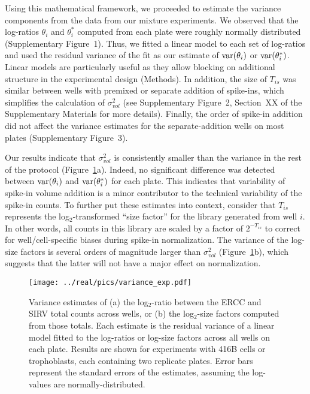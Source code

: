 \documentclass{article}
\newcommand{\suppfignorm}{1}
\newcommand{\suppfigtotals}{2}
\newcommand{\suppfigorder}{3}
\begin{document}
Using this mathematical framework, we proceeded to estimate the variance components from the data from our mixture experiments.
We observed that the log-ratios $\theta_i$ and $\theta^*_i$ computed from each plate were roughly normally distributed (Supplementary Figure~\suppfignorm{}).
Thus, we fitted a linear model to each set of log-ratios and used the residual variance of the fit as our estimate of $\mbox{var}(\theta_i)$ or $\mbox{var}(\theta^*_i)$.
Linear models are particularly useful as they allow blocking on additional structure in the experimental design (Methods).
In addition, the size of $T_{is}$ was similar between wells with premixed or separate addition of spike-ins, which simplifies the calculation of $\sigma^2_{vol}$ (see Supplementary Figure~\suppfigtotals{}, Section~XX of the Supplementary Materials for more details).
Finally, the order of spike-in addition did not affect the variance estimates for the separate-addition wells on most plates (Supplementary Figure~\suppfigorder{}).

Our results indicate that $\sigma^2_{vol}$ is consistently smaller than the variance in the rest of the protocol (Figure~\ref{fig:varestimates}a).
Indeed, no significant difference was detected between $\mbox{var}(\theta_i)$ and $\mbox{var}(\theta^*_i)$ for each plate.
This indicates that variability of spike-in volume addition is a minor contributor to the technical variability of the spike-in counts.
To further put these estimates into context, consider that $T_{is}$ represents the log$_2$-transformed ``size factor'' for the library generated from well $i$.
In other words, all counts in this library are scaled by a factor of $2^{-T_{is}}$ to correct for well/cell-specific biases during spike-in normalization.
The variance of the log-size factors is several orders of magnitude larger than $\sigma^2_{vol}$ (Figure~\ref{fig:varestimates}b), which suggests that the latter will not have a major effect on normalization.

\begin{figure}[btp]
    \begin{center}
        \texttt{[image: ../real/pics/variance\_exp.pdf]}
    \end{center}
    \caption{Variance estimates of (a) the log$_2$-ratio between the ERCC and SIRV total counts across wells, or (b) the log$_2$-size factors computed from those totals.
        Each estimate is the residual variance of a linear model fitted to the log-ratios or log-size factors across all wells on each plate.
        Results are shown for experiments with 416B cells or trophoblasts, each containing two replicate plates.
        Error bars represent the standard errors of the estimates, assuming the log-values are normally-distributed.
    }
    \label{fig:varestimates}
\end{figure}
\end{document}

